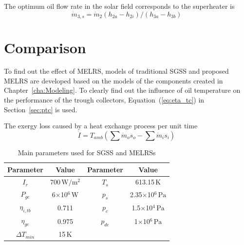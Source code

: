 The optimum oil flow rate in the solar field corresponds to the superheater is
\begin{equation}
  \dot{m}_{3,s} = \dot{m}_{2}(h_{2a} - h_{2i})/(h_{3a} - h_{3b})
\end{equation}

\section{Comparison}

To find out the effect of MELRS, models of traditional SGSS and proposed MELRS are developed based on the models of the components created in Chapter~\ref{cha:Modeling}. 
To clearly find out the influence of oil temperature on the performance of the trough collectors, Equation~(\ref{eq:eta_tc}) in Section~\ref{sec:ptc} is used.

The exergy loss caused by a heat exchange process per unit time
\begin{equation}
  \dot{I} = T_{amb} (\sum \dot{m}_os_o - \sum \dot{m}_is_i)
  \label{eq:dot_I}
\end{equation}

\begin{table}[htbp]
	\caption{Main parameters used for SGSS and MELRSs}
	\begin{center}
	\begin{tabular}{cccc}
		\toprule
		Parameter		&	Value	&	Parameter		&	Value\\
		\midrule
		$I_r$	&	700$\,\mathrm{W/m^2}$	&	$T_s$		&	613.15$\,\mathrm{K}$\\
		$P_{ge}$	&	6$\times$10$^6\,\mathrm{W}$	&	$p_s$		&	2.35$\times$10$^6\,\mathrm{Pa}$\\
		$\eta_{i,tb}$	&	0.711	&	$p_c$		&	1.5$\times$10$^4\,\mathrm{Pa}$\\
		$\eta_{ge}$	&	0.975	&	$p_{de}$		&	1$\times$10$^6\,\mathrm{Pa}$\\
		$\Delta T_{min}$	&	15$\,\mathrm{K}$	&	&\\		
		\bottomrule
	\end{tabular}
	\end{center}
	\label{tab:ptc}
\end{table}

